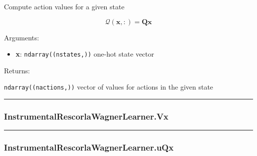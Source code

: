 \begin{Shaded}
\begin{Highlighting}[]
\end{Highlighting}
\end{Shaded}

Compute action values for a given state

\[
\mathcal Q(\mathbf x, :) = \mathbf Q \mathbf x
\]

Arguments:

\begin{itemize}
\tightlist
\item
  \textbf{x}: \texttt{ndarray((nstates,))} one-hot state vector
\end{itemize}

Returns:

\texttt{ndarray((nactions,))} vector of values for actions in the given
state

\begin{center}\rule{0.5\linewidth}{\linethickness}\end{center}

\hypertarget{instrumentalrescorlawagnerlearner.vx}{%
\subsubsection{InstrumentalRescorlaWagnerLearner.Vx}\label{instrumentalrescorlawagnerlearner.vx}}

\begin{Shaded}
\begin{Highlighting}[]
\end{Highlighting}
\end{Shaded}

\begin{center}\rule{0.5\linewidth}{\linethickness}\end{center}

\hypertarget{instrumentalrescorlawagnerlearner.uqx}{%
\subsubsection{InstrumentalRescorlaWagnerLearner.uQx}\label{instrumentalrescorlawagnerlearner.uqx}}

\begin{Shaded}
\begin{Highlighting}[]
\end{Highlighting}
\end{Shaded}

